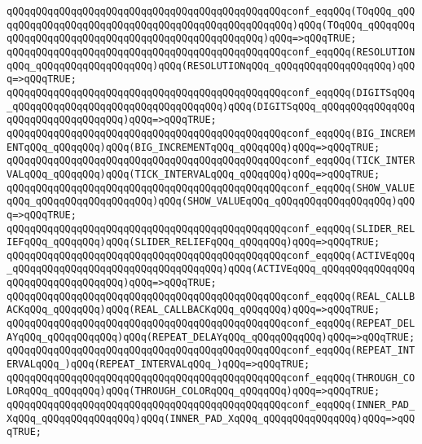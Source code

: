 \verb|qQQqqQQqqQQqqQQqqQQqqQQqqQQqqQQqqQQqqQQqqQQqqQQqconf_eqqQQq(TOqQQq_qQQqqQQqqQQqqQQqqQQqqQQqqQQqqQQqqQQqqQQqqQQqqQQqqQQq)qQQq(TOqQQq_qQQqqQQqqQQqqQQqqQQqqQQqqQQqqQQqqQQqqQQqqQQqqQQqqQQq)qQQq=>qQQqTRUE;|\newline
\verb|qQQqqQQqqQQqqQQqqQQqqQQqqQQqqQQqqQQqqQQqqQQqqQQqconf_eqqQQq(RESOLUTIONqQQq_qQQqqQQqqQQqqQQqqQQq)qQQq(RESOLUTIONqQQq_qQQqqQQqqQQqqQQqqQQq)qQQq=>qQQqTRUE;|\newline
\verb|qQQqqQQqqQQqqQQqqQQqqQQqqQQqqQQqqQQqqQQqqQQqqQQqconf_eqqQQq(DIGITSqQQq_qQQqqQQqqQQqqQQqqQQqqQQqqQQqqQQqqQQq)qQQq(DIGITSqQQq_qQQqqQQqqQQqqQQqqQQqqQQqqQQqqQQqqQQq)qQQq=>qQQqTRUE;|\newline
\verb|qQQqqQQqqQQqqQQqqQQqqQQqqQQqqQQqqQQqqQQqqQQqqQQqconf_eqqQQq(BIG_INCREMENTqQQq_qQQqqQQq)qQQq(BIG_INCREMENTqQQq_qQQqqQQq)qQQq=>qQQqTRUE;|\newline
\verb|qQQqqQQqqQQqqQQqqQQqqQQqqQQqqQQqqQQqqQQqqQQqqQQqconf_eqqQQq(TICK_INTERVALqQQq_qQQqqQQq)qQQq(TICK_INTERVALqQQq_qQQqqQQq)qQQq=>qQQqTRUE;|\newline
\verb|qQQqqQQqqQQqqQQqqQQqqQQqqQQqqQQqqQQqqQQqqQQqqQQqconf_eqqQQq(SHOW_VALUEqQQq_qQQqqQQqqQQqqQQqqQQq)qQQq(SHOW_VALUEqQQq_qQQqqQQqqQQqqQQqqQQq)qQQq=>qQQqTRUE;|\newline
\verb|qQQqqQQqqQQqqQQqqQQqqQQqqQQqqQQqqQQqqQQqqQQqqQQqconf_eqqQQq(SLIDER_RELIEFqQQq_qQQqqQQq)qQQq(SLIDER_RELIEFqQQq_qQQqqQQq)qQQq=>qQQqTRUE;|\newline
\verb|qQQqqQQqqQQqqQQqqQQqqQQqqQQqqQQqqQQqqQQqqQQqqQQqconf_eqqQQq(ACTIVEqQQq_qQQqqQQqqQQqqQQqqQQqqQQqqQQqqQQqqQQq)qQQq(ACTIVEqQQq_qQQqqQQqqQQqqQQqqQQqqQQqqQQqqQQqqQQq)qQQq=>qQQqTRUE;|\newline
\verb|qQQqqQQqqQQqqQQqqQQqqQQqqQQqqQQqqQQqqQQqqQQqqQQqconf_eqqQQq(REAL_CALLBACKqQQq_qQQqqQQq)qQQq(REAL_CALLBACKqQQq_qQQqqQQq)qQQq=>qQQqTRUE;|\newline
\verb|qQQqqQQqqQQqqQQqqQQqqQQqqQQqqQQqqQQqqQQqqQQqqQQqconf_eqqQQq(REPEAT_DELAYqQQq_qQQqqQQqqQQq)qQQq(REPEAT_DELAYqQQq_qQQqqQQqqQQq)qQQq=>qQQqTRUE;|\newline
\verb|qQQqqQQqqQQqqQQqqQQqqQQqqQQqqQQqqQQqqQQqqQQqqQQqconf_eqqQQq(REPEAT_INTERVALqQQq_)qQQq(REPEAT_INTERVALqQQq_)qQQq=>qQQqTRUE;|\newline
\verb|qQQqqQQqqQQqqQQqqQQqqQQqqQQqqQQqqQQqqQQqqQQqqQQqconf_eqqQQq(THROUGH_COLORqQQq_qQQqqQQq)qQQq(THROUGH_COLORqQQq_qQQqqQQq)qQQq=>qQQqTRUE;|\newline
\verb|qQQqqQQqqQQqqQQqqQQqqQQqqQQqqQQqqQQqqQQqqQQqqQQqconf_eqqQQq(INNER_PAD_XqQQq_qQQqqQQqqQQqqQQq)qQQq(INNER_PAD_XqQQq_qQQqqQQqqQQqqQQq)qQQq=>qQQqTRUE;|\newline
